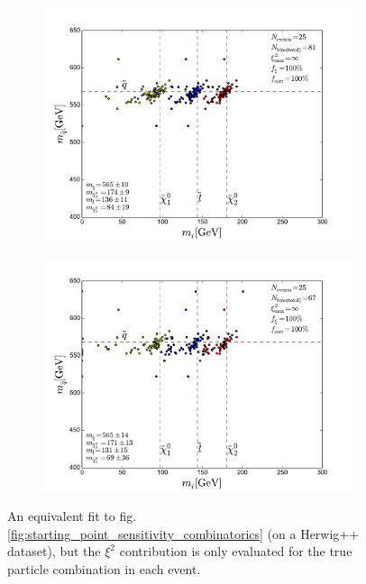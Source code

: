 \documentclass[twoside,english]{uiofysmaster}
\begin{document}
\begin{figure}[hbt]
	\begin{subfigure}[b]{0.45\textwidth}
		\includegraphics[width=\textwidth]{figures/improving_combinatorics/herwigpp-momcons_nocomb_800-500-300-50.pdf} 
		\caption{ }
	\end{subfigure}
	\begin{subfigure}[b]{0.45\textwidth}
		\includegraphics[width=\textwidth]{figures/improving_combinatorics/herwigpp-momcons_nocomb_1000-100-80-30.pdf}
		\caption{ } 
	\end{subfigure}
	\caption{An equivalent fit to fig. \ref{fig:starting_point_sensitivity_combinatorics} (on a {\ttfamily Herwig++} dataset), but the $\xi^2$ contribution is only evaluated for the true particle combination in each event.}
	\label{fig:starting_point_sensitivity_no_combinatorics}
\end{figure}
\end{document}

